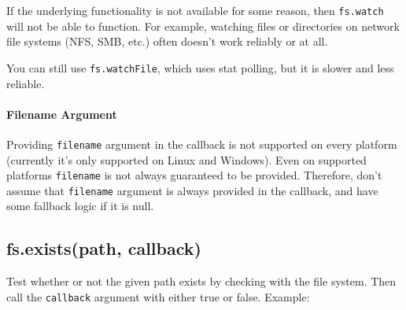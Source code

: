 If the underlying functionality is not available for some reason, then
\texttt{fs.watch} will not be able to function. For example, watching
files or directories on network file systems (NFS, SMB, etc.) often
doesn't work reliably or at all.

You can still use \texttt{fs.watchFile}, which uses stat polling, but it
is slower and less reliable.

\paragraph{Filename Argument}

Providing \texttt{filename} argument in the callback is not supported on
every platform (currently it's only supported on Linux and Windows).
Even on supported platforms \texttt{filename} is not always guaranteed
to be provided. Therefore, don't assume that \texttt{filename} argument
is always provided in the callback, and have some fallback logic if it
is null.

\begin{Shaded}
\begin{Highlighting}[]
\NormalTok{(}\NormalTok{, } 
  \NormalTok{(} 
   
    \NormalTok{(} 
  \NormalTok{\} } \NormalTok{\{}
    \NormalTok{(}\NormalTok{);}
  \NormalTok{\}}
\NormalTok{\});}
\end{Highlighting}
\end{Shaded}

\subsection{fs.exists(path, callback)}

Test whether or not the given path exists by checking with the file
system. Then call the \texttt{callback} argument with either true or
false. Example:

\begin{Shaded}
\begin{Highlighting}[]
\NormalTok{(}\NormalTok{, } 
   \NormalTok{: }\NormalTok{);}
\NormalTok{\});}
\end{Highlighting}
\end{Shaded}

